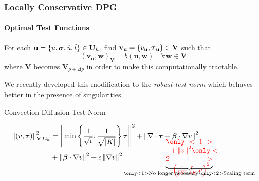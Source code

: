 \documentclass[18pt,xcolor=table]{beamer}
\begin{document}
\begin{frame}
\frametitle{Locally Conservative DPG}
\framesubtitle{Optimal Test Functions}
For each $\mathbf{u}=\{u,\boldsymbol\sigma,\hat u,\hat t\}\in\mathbf{U}_h$, find
$\mathbf{v}_{\mathbf{u}}=\{v_\mathbf{u},\boldsymbol\tau_\mathbf{u}\}\in\mathbf{V}$ such that
\[
(\mathbf{v_u},\mathbf{w})_\mathbf{V}=b(\mathbf{u},\mathbf{w})\quad\forall\mathbf{w}\in\mathbf{V}
\]
where $\mathbf{V}$ becomes $\mathbf{V}_{p+\Delta p}$ in order to make this
computationally tractable.

We recently developed this modification to the \emph{robust test norm}
 which behaves better in
the presence of singularities.
\begin{block}{Convection-Diffusion Test Norm}
\begin{minipage}[t][1.2in]{\textwidth}
\begin{align*}
\norm{(v,\bftau)}^2_{\mathbf{V},\Omega_h}&=
\norm{\min\left\{\frac{1}{\sqrt{\epsilon}},\frac{1}{\sqrt{|K|}}\right\}\bftau}^2
+\norm{\nabla\cdot\bftau-\bfbeta\cdot\nabla v}^2\\
&+\norm{\bfbeta\cdot\nabla v}^2+\epsilon\norm{\nabla v}^2
\underbrace{\color{red}{
\begin{minipage}[c][0.3in][c]{0.9in}$
\only<1>{
\hspace{1.5ex}
+\norm{v}^2
}
\only<2>{
+\left(\frac{1}{|K|}\int_Kv\right)^2
}$
\end{minipage}
}}_{\only<1>{\text{No longer necessary}}\only<2>{\text{Scaling term}}}
\end{align*}
\end{minipage}
\end{block}
\end{frame}
\end{document}
